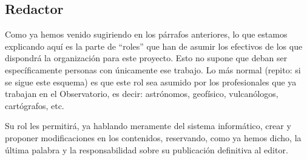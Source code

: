 \subsection{Redactor}
\par Como ya hemos venido sugiriendo en los párrafos anteriores, lo que estamos explicando aquí es la parte de ``roles'' que han de asumir los efectivos de los que dispondrá la organización para este proyecto. Esto no supone que deban ser específicamente personas con únicamente ese trabajo. Lo más normal (repito: si se sigue este esquema) es que este rol sea asumido por los profesionales que ya trabajan en el Observatorio, es decir: astrónomos, geofísico, vulcanólogos, cartógrafos, etc.
\par Su rol les permitirá, ya hablando meramente del sistema informático, crear y proponer modificaciones en los contenidos, reservando, como ya hemos dicho, la última palabra y la responsabilidad sobre su publicación definitiva al editor.

